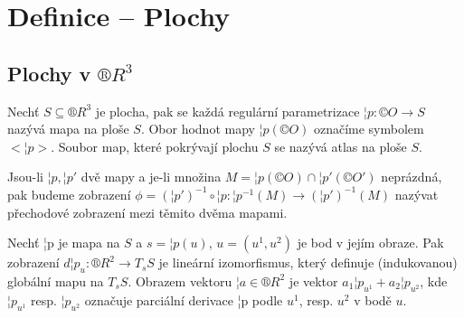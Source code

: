 \documentclass[12pt]{article}                   %
\begin{document}
\section{Definice -- Plochy}
    \subsection{Plochy v $®R^3$}
        \begin{definice}
            Nechť $S \subseteq ®R^3$ je plocha, pak se každá regulární parametrizace $¦p: ©O \rightarrow S$ nazývá mapa na ploše $S$. Obor hodnot mapy $¦p(©O)$ označíme symbolem $<¦p>$. Soubor map, které pokrývají plochu $S$ se nazývá atlas na ploše $S$.

            Jsou-li $¦p, ¦p'$ dvě mapy a je-li množina $M = ¦p(©O) \cap ¦p'(©O')$ neprázdná, pak budeme zobrazení $\phi = (¦p')^{-1} \circ ¦p: ¦p^{-1}(M) \rightarrow (¦p')^{-1}(M)$ nazývat přechodové zobrazení mezi těmito dvěma mapami.
        \end{definice}

        \begin{definice}
            Nechť ¦p je mapa na $S$ a $s = ¦p(u)$, $u = (u^1, u^2)$ je bod v jejím obraze. Pak zobrazení $d¦p_u: ®R^2 \rightarrow T_sS$ je lineární izomorfismus, který definuje (indukovanou) globální mapu na $T_sS$. Obrazem vektoru $¦a \in ®R^2$ je vektor $a_1¦p_{u^1} + a_2¦p_{u^2}$, kde $¦p_{u^1}$ resp. $¦p_{u^2}$ označuje parciální derivace ¦p podle $u^1$, resp. $u^2$ v bodě $u$.
        \end{definice}
\end{document}
